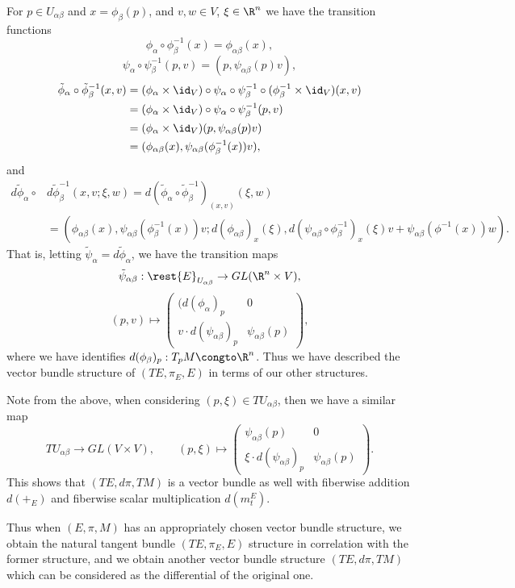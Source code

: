 For $p\in U_{\alpha\beta}$ and $x=\phi_\beta(p)$, and $v,w\in V$, $\xi\in\R^n$ we have the transition functions
$$\phi_\alpha\circ\phi_\beta^{-1}(x)=\phi_{\alpha\beta}(x),$$
$$\psi_\alpha\circ\psi_\beta^{-1}(p,v)=(p,\psi_{\alpha\beta}(p)v),$$
\begin{align*}
	\tilde{\phi}_\alpha\circ\tilde{\phi}_\beta^{-1}(x,v)&=(\phi_\alpha\times\id_V)\circ\psi_\alpha\circ\psi_\beta^{-1}\circ(\phi_\beta^{-1}\times\id_V)(x,v)\\
	&=(\phi_\alpha\times\id_V)\circ\psi_\alpha\circ\psi_\beta^{-1}(p,v)\\
	&=(\phi_\alpha\times\id_V)(p,\psi_{\alpha\beta}(p)v)\\
	&=(\phi_{\alpha\beta}(x),\psi_{\alpha\beta}(\phi_\beta^{-1}(x))v),
\end{align*}
and
\begin{align*}
	d\tilde{\phi}_\alpha\circ & d\tilde{\phi}_\beta^{-1}(x,v;\xi,w)=d(\tilde{\phi}_\alpha\circ\tilde{\phi}_\beta^{-1})_{(x,v)}(\xi,w)\\
	&=(\phi_{\alpha\beta}(x),\psi_{\alpha\beta}(\phi_\beta^{-1}(x))v;d(\phi_{\alpha\beta})_x(\xi),d(\psi_{\alpha\beta}\circ\phi_\beta^{-1})_x(\xi)v+\psi_{\alpha\beta}(\phi^{-1}(x))w).
\end{align*}
That is, letting $\tilde{\psi}_\alpha=d\tilde{\phi}_\alpha$, we have the transition maps 
$$\tilde{\psi}_{\alpha\beta}:\rest{E}_{U_{\alpha\beta}}\to GL(\R^n\times V),$$
$$(p,v)\mapsto \begin{pmatrix}(d(\phi_\alpha)_p&0\\
 	v\cdot d(\psi_{\alpha\beta})_p&\psi_{\alpha\beta}(p)
 \end{pmatrix},$$
 where we have identifies $d(\phi_\beta)_p:T_pM\congto\R^n$.  Thus we have described the vector bundle structure of $(TE,\pi_E,E)$ in terms of our other structures.
 
 Note from the above, when considering $(p,\xi)\in TU_{\alpha\beta}$, then we have a similar map
 $$TU_{\alpha\beta}\to GL(V\times V),\qquad (p,\xi)\mapsto \begin{pmatrix}\psi_{\alpha\beta}(p)&0\\
 	\xi\cdot d(\psi_{\alpha\beta})_p&\psi_{\alpha\beta}(p)
 \end{pmatrix}.$$
 This shows that $(TE,d\pi,TM)$ is a vector bundle as well with fiberwise addition $d(+_E)$ and fiberwise scalar multiplication $d(m_t^E)$.
 
 Thus when $(E,\pi,M)$ has an appropriately chosen vector bundle structure, we obtain the natural tangent bundle $(TE,\pi_E,E)$ structure in correlation with the former structure, and we obtain another vector bundle structure $(TE,d\pi, TM)$ which can be considered as the differential of the original one.
 
